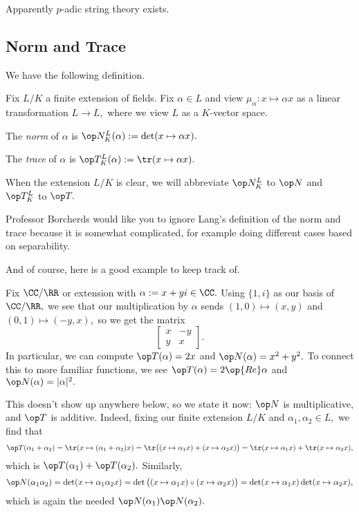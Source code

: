 \begin{remark}
	Apparently $p$-adic string theory exists.
\end{remark}

\subsection{Norm and Trace}
We have the following definition.
\begin{definition}
	Fix $L/K$ a finite extension of fields. Fix $\alpha\in L$ and view $\mu_\alpha:x\mapsto \alpha x$ as a linear transformation $L\to L,$ where we view $L$ as a $K$-vector space.
	\begin{listalph}
		\item The \textit{norm} of $\alpha$ is $\op N^L_K(\alpha):=\det(x\mapsto \alpha x).$ 
		\item The \textit{trace} of $\alpha$ is $\op T^L_K(\alpha):=\tr (x\mapsto \alpha x).$
	\end{listalph}
	When the extension $L/K$ is clear, we will abbreviate $\op N^L_K$ to $\op N$ and $\op T^L_K$ to $\op T.$
\end{definition}
\begin{warn}
	Professor Borcherds would like you to ignore Lang's definition of the norm and trace because it is somewhat complicated, for example doing different cases based on separability.
\end{warn}
And of course, here is a good example to keep track of.
\begin{ex}
	Fix $\CC/\RR$ or extension with $\alpha:=x+yi\in\CC.$ Using $\{1,i\}$ as our basis of $\CC/\RR,$ we see that our multiplication by $\alpha$ sends $(1,0)\mapsto(x,y)$ and $(0,1)\mapsto(-y,x),$ so we get the matrix
	\[\begin{bmatrix}
		x & -y \\
		y & x
	\end{bmatrix}.\]
	In particular, we can compute $\op T(\alpha)=2x$ and $\op N(\alpha)=x^2+y^2.$ To connect this to more familiar functions, we see $\op T(\alpha)=2\op{Re}\alpha$ and $\op N(\alpha)=|\alpha|^2.$
\end{ex}
\begin{remark}[Nir]
	This doesn't show up anywhere below, so we state it now: $\op N$ is multiplicative, and $\op T$ is additive. Indeed, fixing our finite extension $L/K$ and $\alpha_1,\alpha_2\in L,$ we find that
	\[\op T(\alpha_1+\alpha_2)=\tr(x\mapsto(\alpha_1+\alpha_2)x)=\tr\big((x\mapsto\alpha_1x)+(x\mapsto\alpha_2x)\big)=\tr(x\mapsto\alpha_1x)+\tr(x\mapsto\alpha_2x),\]
	which is $\op T(\alpha_1)+\op T(\alpha_2).$ Similarly,
	\[\op N(\alpha_1\alpha_2)=\det(x\mapsto\alpha_1\alpha_2x)=\det\big((x\mapsto\alpha_1x)\circ(x\mapsto\alpha_2x)\big)=\det(x\mapsto\alpha_1x)\det(x\mapsto\alpha_2x),\]
	which is again the needed $\op N(\alpha_1)\op N(\alpha_2).$
\end{remark}
